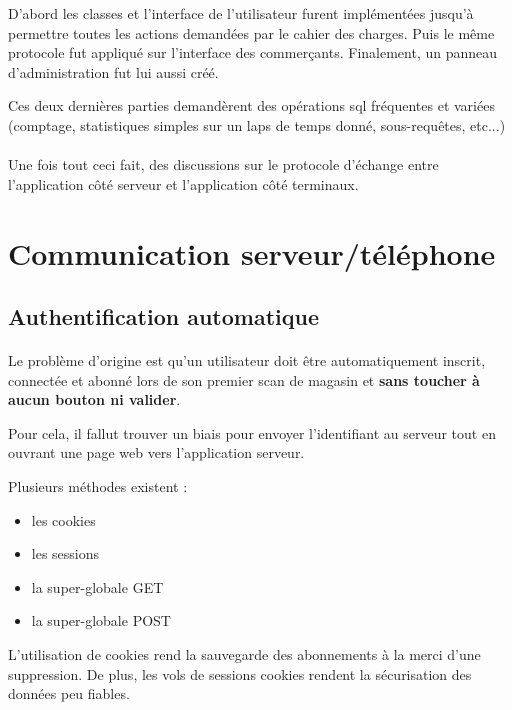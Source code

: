 \documentclass[a4paper,12pt,titlepage]{report}
\begin{document}
D'abord les classes et l'interface de l'utilisateur furent implémentées jusqu'à permettre toutes les actions demandées par le cahier des charges. Puis le même protocole fut appliqué sur l'interface des commerçants. Finalement, un panneau d'administration fut lui aussi créé.

Ces deux dernières parties demandèrent des opérations sql fréquentes et variées (comptage, statistiques simples sur un laps de temps donné, sous-requêtes, etc...)

\paragraph*{}

Une fois tout ceci fait, des discussions sur le protocole d'échange entre l'application côté serveur et l'application côté terminaux.


\section{Communication serveur/téléphone}

\subsection{Authentification automatique}

\paragraph*{}
Le problème d'origine est qu'un utilisateur doit être automatiquement inscrit, connectée et abonné lors de son premier scan de magasin et \textbf{sans toucher à aucun bouton ni valider}.

Pour cela, il fallut trouver un biais pour envoyer l'identifiant au serveur tout en ouvrant une page web vers l'application serveur.

Plusieurs méthodes existent :
\begin{itemize}
\item les cookies
\item les sessions
\item la super-globale GET
\item la super-globale POST
\end{itemize}

L'utilisation de cookies rend la sauvegarde des abonnements à la merci d'une suppression. De plus, les vols de sessions cookies rendent la sécurisation des données peu fiables.
\end{document}
